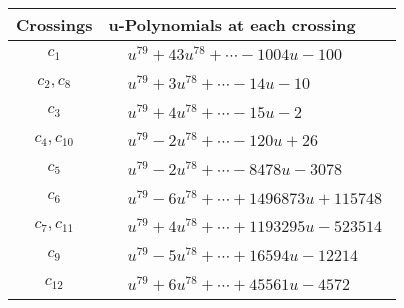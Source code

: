 \documentclass[1p]{elsarticle_modified}
\theoremstyle{definition}
\begin{document}
\begin{tabular}{m{50pt}|m{274pt}}
Crossings & \hspace{64pt}u-Polynomials at each crossing \\
\hline $$\begin{aligned}c_{1}\end{aligned}$$&$\begin{aligned}
&u^{79}+43 u^{78}+\cdots-1004 u-100
\end{aligned}$\\
\hline $$\begin{aligned}c_{2},c_{8}\end{aligned}$$&$\begin{aligned}
&u^{79}+3 u^{78}+\cdots-14 u-10
\end{aligned}$\\
\hline $$\begin{aligned}c_{3}\end{aligned}$$&$\begin{aligned}
&u^{79}+4 u^{78}+\cdots-15 u-2
\end{aligned}$\\
\hline $$\begin{aligned}c_{4},c_{10}\end{aligned}$$&$\begin{aligned}
&u^{79}-2 u^{78}+\cdots-120 u+26
\end{aligned}$\\
\hline $$\begin{aligned}c_{5}\end{aligned}$$&$\begin{aligned}
&u^{79}-2 u^{78}+\cdots-8478 u-3078
\end{aligned}$\\
\hline $$\begin{aligned}c_{6}\end{aligned}$$&$\begin{aligned}
&u^{79}-6 u^{78}+\cdots+1496873 u+115748
\end{aligned}$\\
\hline $$\begin{aligned}c_{7},c_{11}\end{aligned}$$&$\begin{aligned}
&u^{79}+4 u^{78}+\cdots+1193295 u-523514
\end{aligned}$\\
\hline $$\begin{aligned}c_{9}\end{aligned}$$&$\begin{aligned}
&u^{79}-5 u^{78}+\cdots+16594 u-12214
\end{aligned}$\\
\hline $$\begin{aligned}c_{12}\end{aligned}$$&$\begin{aligned}
&u^{79}+6 u^{78}+\cdots+45561 u-4572
\end{aligned}$\\
\hline
\end{tabular}\\~\\
\end{document}
